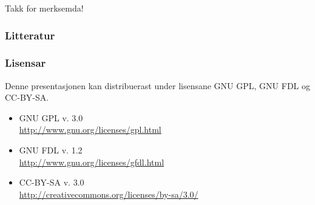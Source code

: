 \documentclass[bigger]{beamer}
\begin{document}
\begin{frame}
  \begin{center}
    {\huge Takk for merksemda!}
  \end{center}
\end{frame}

\begin{frame}\frametitle{Litteratur}
  \nocite{dyvik2009lmp}
  
  
\end{frame}

\begin{frame}\frametitle{Lisensar}
  Denne presentasjonen kan distribuerast under lisensane
  GNU GPL, GNU FDL og CC-BY-SA.
  \begin{itemize}
  \item GNU GPL v. 3.0 \\
    \href{http://www.gnu.org/licenses/gpl.html}{http://www.gnu.org/licenses/gpl.html}
  \item GNU FDL v. 1.2 \\
    \href{http://www.gnu.org/licenses/gfdl.html}{http://www.gnu.org/licenses/gfdl.html}
  \item CC-BY-SA v. 3.0 \\
    \href{http://creativecommons.org/licenses/by-sa/3.0/}{http://creativecommons.org/licenses/by-sa/3.0/}
  \end{itemize}
\end{frame}
\end{document}
